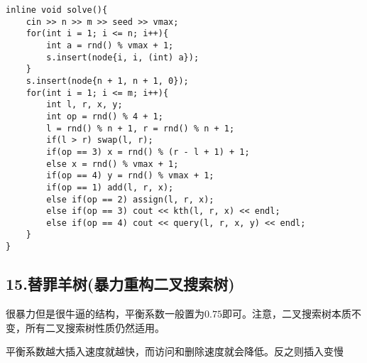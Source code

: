 \documentclass[]{article}
\begin{document}
\begin{verbatim}
inline void solve(){
    cin >> n >> m >> seed >> vmax;
    for(int i = 1; i <= n; i++){
        int a = rnd() % vmax + 1;
        s.insert(node{i, i, (int) a});
    }
    s.insert(node{n + 1, n + 1, 0});
    for(int i = 1; i <= m; i++){
        int l, r, x, y;
        int op = rnd() % 4 + 1;
        l = rnd() % n + 1, r = rnd() % n + 1;
        if(l > r) swap(l, r);
        if(op == 3) x = rnd() % (r - l + 1) + 1;
        else x = rnd() % vmax + 1;
        if(op == 4) y = rnd() % vmax + 1;
        if(op == 1) add(l, r, x);
        else if(op == 2) assign(l, r, x);
        else if(op == 3) cout << kth(l, r, x) << endl;
        else if(op == 4) cout << query(l, r, x, y) << endl;
    }
}
\end{verbatim}

\hypertarget{ux66ffux7f6aux7f8aux6811ux66b4ux529bux91cdux6784ux4e8cux53c9ux641cux7d22ux6811}{%
\subsection{15.替罪羊树(暴力重构二叉搜索树)}\label{ux66ffux7f6aux7f8aux6811ux66b4ux529bux91cdux6784ux4e8cux53c9ux641cux7d22ux6811}}

很暴力但是很牛逼的结构，平衡系数一般置为\(0.75\)即可。注意，二叉搜索树本质不变，所有二叉搜索树性质仍然适用。

平衡系数越大插入速度就越快，而访问和删除速度就会降低。反之则插入变慢
\end{document}
